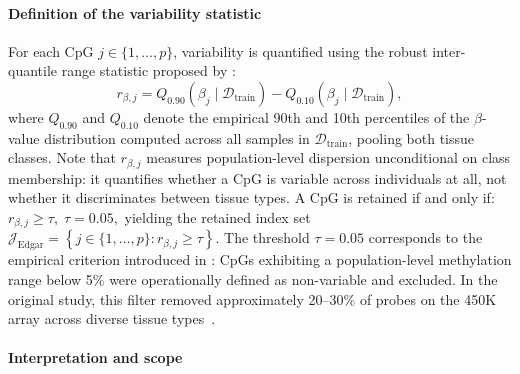 \paragraph{Definition of the variability statistic}

For each CpG $j \in \{1,\dots,p\}$, variability is quantified 
using the robust inter-quantile range statistic proposed 
by \cite{Edgar2017}:
\begin{equation}
    r_{\beta,j}
    =
    Q_{0.90}\!\left(\beta_{j} \mid 
    \mathcal{D}_{\mathrm{train}}\right)
    -
    Q_{0.10}\!\left(\beta_{j} \mid 
    \mathcal{D}_{\mathrm{train}}\right),
    \label{eq:rbeta}
\end{equation}
where $Q_{0.90}$ and $Q_{0.10}$ denote the empirical 90th 
and 10th percentiles of the $\beta$-value distribution 
computed across all samples in $\mathcal{D}_{\mathrm{train}}$, 
pooling both tissue classes. Note that $r_{\beta,j}$ measures 
population-level dispersion unconditional on class membership: 
it quantifies whether a CpG is variable across individuals 
at all, not whether it discriminates between tissue types.
A CpG is retained if and only if:
$
    r_{\beta,j} \geq \tau, 
    \; \tau = 0.05,
$
yielding the retained index set
$    \mathcal{J}_{\mathrm{Edgar}} 
    = 
    \left\{ j \in \{1,\dots,p\} : r_{\beta,j} \geq \tau \right\}.$
The threshold $\tau = 0.05$ corresponds to the empirical 
criterion introduced in \cite{Edgar2017}: CpGs exhibiting 
a population-level methylation range below 5\% were 
operationally defined as non-variable and excluded. 
In the original study, this filter removed approximately 
20--30\% of probes on the 450K array across diverse tissue 
types~\cite{Edgar2017}.

\paragraph{Interpretation and scope}

